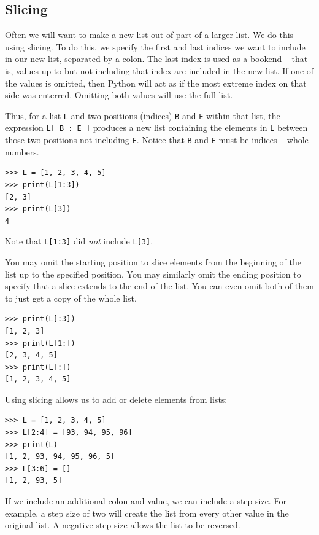 \documentclass[11pt]{cselabheader}
\begin{document}
\subsection{Slicing}
Often we will want to make a new list out of part of a larger list. We do this
using slicing. To do this, we specify the first and last indices we want to
include in our new list, separated by a colon. The last index is used as a
bookend -- that is, values up to but not including that index are included in
the new list. If one of the values is omitted, then Python will act as if the
most extreme index on that side was enterred. Omitting both values will use the
full list.

Thus, for a list \lstinline!L! and two positions (indices) \lstinline!B! and
\lstinline!E! within that list, the expression \lstinline!L[ B : E ]! produces a
new list containing the elements in \lstinline!L! between those two positions
not including \lstinline!E!. Notice that \lstinline!B! and \lstinline!E! must be
indices -- whole numbers.

\begin{lstlisting}[style=ipython]
>>> L = [1, 2, 3, 4, 5]
>>> print(L[1:3])
[2, 3]
>>> print(L[3])
4
\end{lstlisting}

Note that \lstinline!L[1:3]! did \emph{not} include \lstinline!L[3]!. 

You may omit the starting position to slice elements from the beginning of the
list up to the specified position. You may similarly omit the ending position to
specify that a slice extends to the end of the list. You can even omit both of
them to just get a copy of the whole list.

\begin{lstlisting}[style=ipython]
>>> print(L[:3])
[1, 2, 3]
>>> print(L[1:])
[2, 3, 4, 5]
>>> print(L[:])
[1, 2, 3, 4, 5]
\end{lstlisting}

Using slicing allows us to add or delete elements from lists:
\begin{lstlisting}[style=ipython]
>>> L = [1, 2, 3, 4, 5]
>>> L[2:4] = [93, 94, 95, 96]
>>> print(L)
[1, 2, 93, 94, 95, 96, 5]
>>> L[3:6] = []
[1, 2, 93, 5]
\end{lstlisting}

If we include an additional colon and value, we can include a step size. For
example, a step size of two will create the list from every other value in the
original list. A negative step size allows the list to be reversed.
\end{document}

